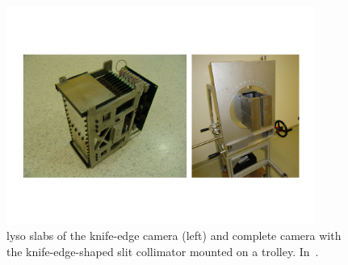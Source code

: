 \begin{figure}[!htbp]
\centering
\includegraphics[width=0.9\textwidth, trim={0 3cm 0 3cm}, clip]{03_GraphicFiles/chapter2_GammaCameras/knife_edge_IBA.pdf}
\caption{\gls{lyso} slabs of the knife-edge camera (left) and complete camera with the knife-edge-shaped slit collimator mounted on a trolley. In~\cite{Priegnitz2015}.}
\label{chap2::fig::KE_IBA}
\end{figure}  

